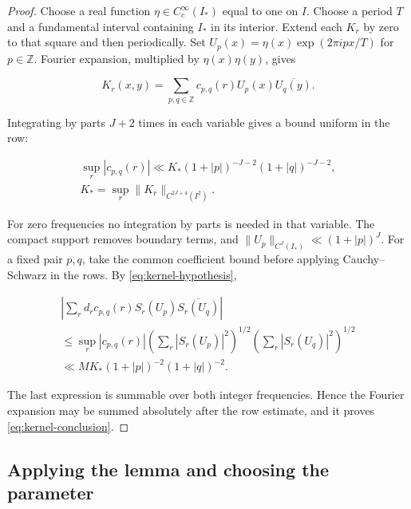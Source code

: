 \documentclass[reqno,a4paper,11pt]{amsart}
\begin{document}
\begin{proof}

Choose a real function $\eta\in C_c^\infty(I_*)$ equal to one on $I$. Choose a period $T$ and a fundamental interval containing $I_*$ in its interior. Extend each $K_r$ by zero to that square and then periodically. Set $U_p(x)=\eta(x)\exp(2\pi ipx/T)$ for $p\in\mathbb{Z}$. Fourier expansion, multiplied by $\eta(x)\eta(y)$, gives

\begin{equation}\label{eq:kernel-fourier}
K_r(x,y)=\sum_{p,q\in\mathbb{Z}}c_{p,q}(r)U_p(x)\overline{U_q(y)}.
\end{equation}

Integrating by parts $J+2$ times in each variable gives a bound uniform in the row:

\begin{equation}\label{eq:kernel-coefficients}
\begin{gathered}
\sup_r|c_{p,q}(r)|\ll K_*(1+|p|)^{-J-2}(1+|q|)^{-J-2}, \\ K_*=\sup_r\|K_r\|_{C^{2J+4}(I^2)}.
\end{gathered}
\end{equation}

For zero frequencies no integration by parts is needed in that variable. The compact support removes boundary terms, and $\|U_p\|_{C^J(I_*)}\ll(1+|p|)^J$. For a fixed pair $p,q$, take the common coefficient bound before applying Cauchy--Schwarz in the rows. By \eqref{eq:kernel-hypothesis},

\begin{equation}\label{eq:kernel-cauchy}
\begin{gathered}
\left|\sum_r d_rc_{p,q}(r)S_r(U_p)\overline{S_r(U_q)}\right| \\ \le\sup_r|c_{p,q}(r)|\left(\sum_r|S_r(U_p)|^2\right)^{1/2}\left(\sum_r|S_r(U_q)|^2\right)^{1/2} \\ \ll MK_*(1+|p|)^{-2}(1+|q|)^{-2}.
\end{gathered}
\end{equation}

The last expression is summable over both integer frequencies. Hence the Fourier expansion may be summed absolutely after the row estimate, and it proves \eqref{eq:kernel-conclusion}.

\end{proof}

\subsection*{Applying the lemma and choosing the parameter}
\end{document}
